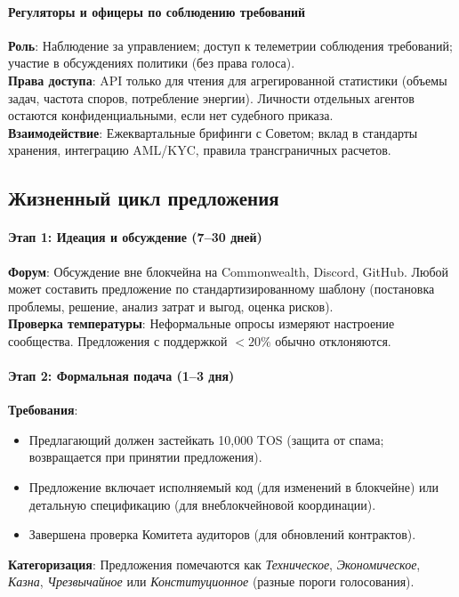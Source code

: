 \documentclass[11pt]{article}
\begin{document}
\paragraph{Регуляторы и офицеры по соблюдению требований}
\textbf{Роль}: Наблюдение за управлением; доступ к телеметрии соблюдения требований; участие в обсуждениях политики (без права голоса).\\
\textbf{Права доступа}: API только для чтения для агрегированной статистики (объемы задач, частота споров, потребление энергии). Личности отдельных агентов остаются конфиденциальными, если нет судебного приказа.\\
\textbf{Взаимодействие}: Ежеквартальные брифинги с Советом; вклад в стандарты хранения, интеграцию AML/KYC, правила трансграничных расчетов.

\subsection{Жизненный цикл предложения}

\paragraph{Этап 1: Идеация и обсуждение (7--30 дней)}
\textbf{Форум}: Обсуждение вне блокчейна на Commonwealth, Discord, GitHub. Любой может составить предложение по стандартизированному шаблону (постановка проблемы, решение, анализ затрат и выгод, оценка рисков).\\
\textbf{Проверка температуры}: Неформальные опросы измеряют настроение сообщества. Предложения с поддержкой $<20\%$ обычно отклоняются.

\paragraph{Этап 2: Формальная подача (1--3 дня)}
\textbf{Требования}:
\begin{itemize}[noitemsep]
  \item Предлагающий должен застейкать 10,000 TOS (защита от спама; возвращается при принятии предложения).
  \item Предложение включает исполняемый код (для изменений в блокчейне) или детальную спецификацию (для внеблокчейновой координации).
  \item Завершена проверка Комитета аудиторов (для обновлений контрактов).
\end{itemize}
\textbf{Категоризация}: Предложения помечаются как \emph{Техническое}, \emph{Экономическое}, \emph{Казна}, \emph{Чрезвычайное} или \emph{Конституционное} (разные пороги голосования).
\end{document}

